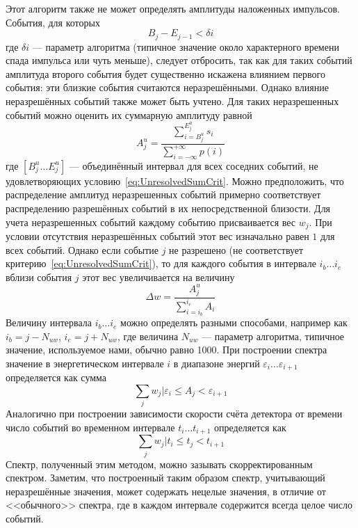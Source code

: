 Этот алгоритм также не может определять амплитуды наложенных импульсов. События, для которых 
\begin{equation}
  \label{eq:UnresolvedSumCrit}
  B_j - E_{j-1} < \delta i 
\end{equation}
где $\delta i$ --- параметр алгоритма (типичное значение около характерного времени спада импульса или чуть меньше), следует отбросить, так как для таких событий амплитуда второго события будет существенно искажена влиянием первого события: эти близкие события считаются неразрешёнными. Однако влияние неразрешённых событий также может быть учтено. Для таких неразрешенных событий можно оценить их суммарную амплитуду равной
\begin{equation}
  \label{eq:UnresolvedAmplitude}
  A_j^u = \frac{  \sum \limits_{i = B^u_j}^{E^u_j} s_i }{ \sum \limits_{i = -\infty}^{+\infty} p(i) }
\end{equation}
где $\left[ B_j^u \ldots E_j^u \right] $ --- объединённый интервал для всех соседних событий, не удовлетворяющих условию~\ref{eq:UnresolvedSumCrit}. Можно предположить, что распределение амплитуд неразрешенных событий примерно соответствует распределению разрешённых событий в их непосредственной близости. Для учета неразрешенных событий каждому событию присваивается вес $w_j$. При условии отсутствия неразрешённых событий этот вес изначально равен $1$ для всех событий. Однако если событие $j$ не разрешено (не соответствует критерию~\ref{eq:UnresolvedSumCrit}), то для каждого события в интервале $i_b \ldots i_e$ вблизи события $j$ этот вес увеличивается на величину
\begin{equation*}
  \Delta w = \frac{ A_j^u }{ \sum \limits_{i=i_b}^{i_e} A_i } 
\end{equation*}
Величину интервала $i_b \ldots i_e$ можно определять разными способами, например как $i_b = j - N_{uw}$, $i_e = j + N_{uw}$, где величина $N_{uw}$ --- параметр алгоритма, типичное значение, используемое нами, обычно равно 1000. При построении спектра значение в энергетическом интервале $i$ в диапазоне энергий $\varepsilon_i \ldots \varepsilon_{i+1}$ определяется как сумма
\begin{equation*}
  \sum_j w_j | \varepsilon_i \le A_j < \varepsilon_{i+1}
\end{equation*}
Аналогично при построении зависимости скорости счёта детектора от времени число событий во временном интервале $t_i \ldots t_{i+1}$ определяется как
\begin{equation*}
  \sum_j w_j | t_i \le t_j < t_{i+1}
\end{equation*}
Спектр, полученный этим методом, можно зазывать скорректированным спектром. Заметим, что построенный таким образом спектр, учитывающий неразрешённые значения, может содержать нецелые значения, в отличие от <<обычного>> спектра, где в каждом интервале содержится всегда целое число событий.~\cite{Khilkevitch2020}

